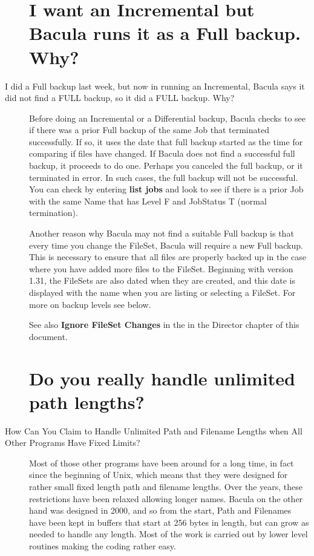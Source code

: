 \begin{description}
\section{I want an Incremental but Bacula runs it as a Full backup. Why?}
\item [I did a Full backup last week, but now in running an Incremental,
   Bacula  says it did not find a FULL backup, so it did a FULL backup. Why?]
   Before doing an Incremental or a Differential
   backup, Bacula checks to see if there was a prior Full backup of the
   same Job that terminated successfully.  If so, it uses the date that
   full backup started as the time for comparing if files have changed.  If
   Bacula does not find a successful full backup, it proceeds to do one.
   Perhaps you canceled the full backup, or it terminated in error.  In
   such cases, the full backup will not be successful.  You can check by
   entering {\bf list jobs} and look to see if there is a prior Job with
   the same Name that has Level F and JobStatus T (normal termination).

   Another reason why Bacula may not find a suitable Full backup is that
   every time you change the FileSet, Bacula will require a new Full
   backup.  This is necessary to ensure that all files are properly backed
   up in the case where you have added more files to the FileSet.
   Beginning with version 1.31, the FileSets are also dated when they are
   created, and this date is displayed with the name when you are listing
   or selecting a FileSet.  For more on backup levels see below.

   See also {\bf Ignore FileSet Changes} in the
    in the Director
   chapter of this document.

\label{filenamelengths}
\section{Do you really handle unlimited path lengths?}
\item [How Can You Claim to Handle Unlimited Path and Filename Lengths
   when  All Other Programs Have Fixed Limits?]
   Most of those other programs have been around for a long time, in fact
   since the beginning of Unix, which means that they were designed for
   rather small fixed length path and filename lengths.  Over the years,
   these restrictions have been relaxed allowing longer names.  Bacula on
   the other hand was designed in 2000, and so from the start, Path and
   Filenames have been kept in buffers that start at 256 bytes in length,
   but can grow as needed to handle any length.  Most of the work is
   carried out by lower level routines making the coding rather easy.


\end{description}
